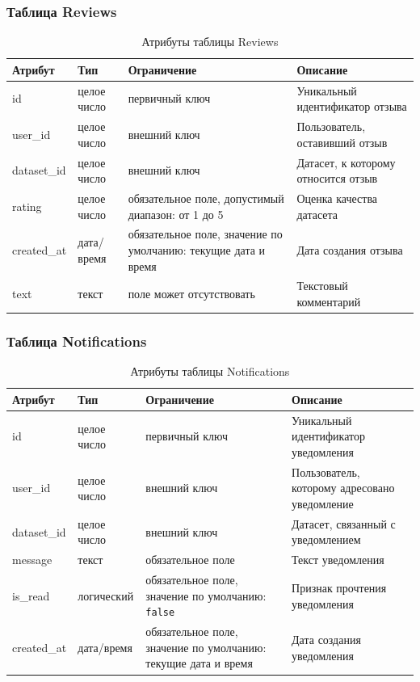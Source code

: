 \subsubsection*{Таблица Reviews}

\begin{table}[H]
\centering
\caption{Атрибуты таблицы Reviews}
\label{tab:reviews}
\renewcommand{\arraystretch}{1.3}
\begin{tabular}{|p{3.5cm}|p{3cm}|p{4cm}|p{4.5cm}|}
\hline
\textbf{Атрибут} & \textbf{Тип} & \textbf{Ограничение} & \textbf{Описание} \\
\hline
id & целое число & первичный ключ & Уникальный идентификатор отзыва \\
\hline
user\_id & целое число & внешний ключ & Пользователь, оставивший отзыв \\
\hline
dataset\_id & целое число & внешний ключ & Датасет, к которому относится отзыв \\
\hline
rating & целое число & обязательное поле, допустимый диапазон: от 1 до 5 & Оценка качества датасета \\
\hline
created\_at & дата/время & обязательное поле, значение по умолчанию: текущие дата и время & Дата создания отзыва \\
\hline
text & текст & поле может отсутствовать & Текстовый комментарий \\
\hline
\end{tabular}
\end{table}

\subsubsection*{Таблица Notifications}

\begin{table}[H]
\centering
\caption{Атрибуты таблицы Notifications}
\label{tab:notifications}
\renewcommand{\arraystretch}{1.3}
\begin{tabular}{|p{3.5cm}|p{3cm}|p{4cm}|p{4.5cm}|}
\hline
\textbf{Атрибут} & \textbf{Тип} & \textbf{Ограничение} & \textbf{Описание} \\
\hline
id & целое число & первичный ключ & Уникальный идентификатор уведомления \\
\hline
user\_id & целое число & внешний ключ & Пользователь, которому адресовано уведомление \\
\hline
dataset\_id & целое число & внешний ключ & Датасет, связанный с уведомлением \\
\hline
message & текст & обязательное поле & Текст уведомления \\
\hline
is\_read & логический & обязательное поле, значение по умолчанию: \texttt{false} & Признак прочтения уведомления \\
\hline
created\_at & дата/время & обязательное поле, значение по умолчанию: текущие дата и время & Дата создания уведомления \\
\hline
\end{tabular}
\end{table}

